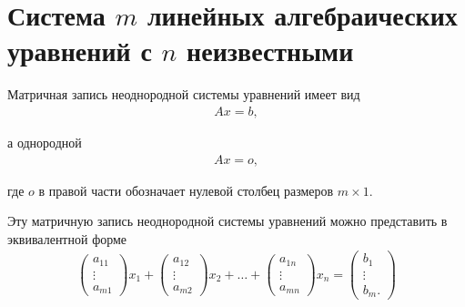 \documentclass[%
	11pt,
	a4paper,
	utf8,
		]{article}
\begin{document}
\section{Система $ m $ линейных алгебраических уравнений с $ n $ неизвестными}

Матричная запись неоднородной системы уравнений имеет вид
\vspace*{-3mm}
\begin{align*}
	A x = b,
\end{align*}

\vspace*{-3mm}
а однородной
\vspace*{-3mm}
\begin{align*}
	A x = o,
\end{align*}

\vspace*{-3mm}
где $ o $ в правой части обозначает нулевой столбец размеров $ m \times 1 $.

Эту матричную запись неоднородной системы уравнений можно представить в эквивалентной форме
\begin{align*}
	\begin{pmatrix}
		a_{11} \\
		\vdots \\
		a_{m1}
	\end{pmatrix} x_1 + 
    \begin{pmatrix}
    	a_{12} \\
    	\vdots \\
    	a_{m2}
    \end{pmatrix} x_2 + \ldots +
    \begin{pmatrix}
    	a_{1n} \\
    	\vdots \\
    	a_{mn}
    \end{pmatrix} x_n = 
    \begin{pmatrix}
    	b_1 \\
    	\vdots \\
    	b_m.
    \end{pmatrix}
\end{align*}
\end{document}
